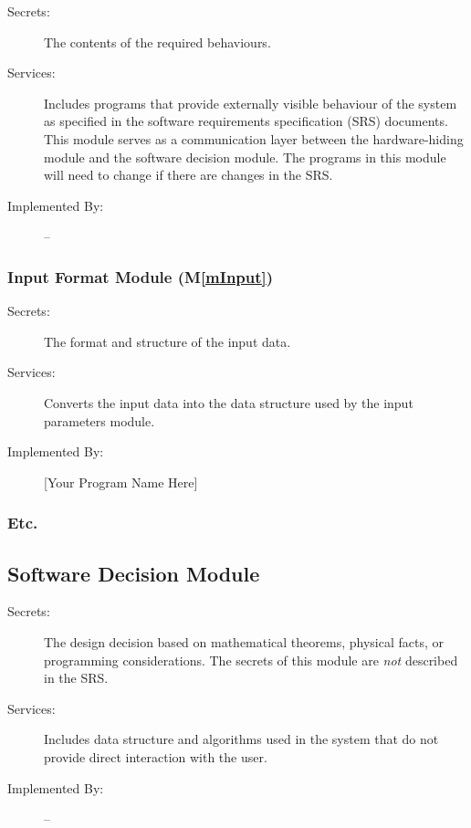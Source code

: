 \documentclass[12pt, titlepage]{article}
\newcommand{\mref}[1]{M\ref{#1}}
\begin{document}
\begin{description}
\item[Secrets:]The contents of the required behaviours.
\item[Services:]Includes programs that provide externally visible behaviour of
  the system as specified in the software requirements specification (SRS)
  documents. This module serves as a communication layer between the
  hardware-hiding module and the software decision module. The programs in this
  module will need to change if there are changes in the SRS.
\item[Implemented By:] --
\end{description}

\subsubsection{Input Format Module (\mref{mInput})}

\begin{description}
\item[Secrets:]The format and structure of the input data.
\item[Services:]Converts the input data into the data structure used by the
  input parameters module.
\item[Implemented By:] [Your Program Name Here]
\end{description}

\subsubsection{Etc.}


\subsection{Software Decision Module}

\begin{description}
\item[Secrets:] The design decision based on mathematical theorems, physical
  facts, or programming considerations. The secrets of this module are
  \emph{not} described in the SRS.
\item[Services:] Includes data structure and algorithms used in the system that
  do not provide direct interaction with the user. 
\item[Implemented By:] --
\end{description}
\end{document}
